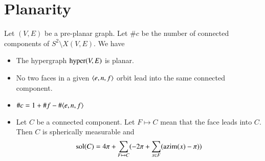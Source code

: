 \section{Planarity}



\begin{lemma}  Let $(V,E)$ be a pre-planar graph.  Let $\#c$ be the number
of connected components of $S^2\setminus X(V,E)$.  We have
    \begin{itemize}
    \item The hypergraph ${\operatorname{hyper}}(V,E)$ is planar.
    \item No two faces in a given $\langle e,n,f\rangle$ orbit lead
    into the same connected component.
    \item $\#c = 1 + \#f - \#\langle e,n,f\rangle$
    \item Let $C$ be a connected component. Let $F\mapsto C$ mean
    that the face leads into $C$.  Then $C$ is spherically measurable and
        $${\operatorname{sol}}(C) = 4\pi + \sum_{F\mapsto C}(-2\pi + \sum_{x\in F}
        ({\operatorname{azim}}(x)-\pi))$$
    \end{itemize}
\end{lemma}

